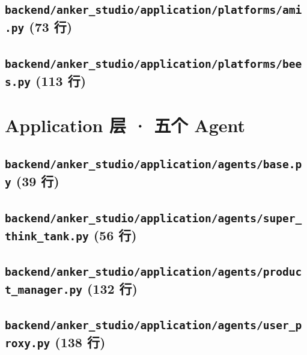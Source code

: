 \subsection*{\texttt{backend/anker\_studio/application/platforms/ami.py} \hfill \normalfont\small (73 行)}


\subsection*{\texttt{backend/anker\_studio/application/platforms/bees.py} \hfill \normalfont\small (113 行)}


\section{Application 层 · 五个 Agent}
\subsection*{\texttt{backend/anker\_studio/application/agents/base.py} \hfill \normalfont\small (39 行)}


\subsection*{\texttt{backend/anker\_studio/application/agents/super\_think\_tank.py} \hfill \normalfont\small (56 行)}


\subsection*{\texttt{backend/anker\_studio/application/agents/product\_manager.py} \hfill \normalfont\small (132 行)}


\subsection*{\texttt{backend/anker\_studio/application/agents/user\_proxy.py} \hfill \normalfont\small (138 行)}


